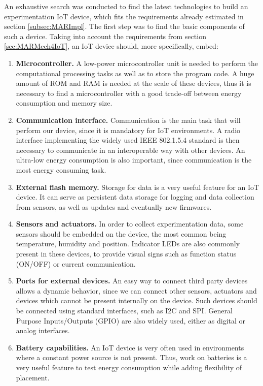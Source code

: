 An exhaustive search was conducted to find the latest technologies to build an experimentation IoT device, which fits the requirements already estimated in section \ref{subsec:MARImpl}.
The first step was to find the basic components of such a device.
Taking into account the requirements from section \ref{sec:MARMech4IoT}, an IoT device should, more specifically, embed:
\begin{enumerate}
	\item \textbf{Microcontroller.} A low-power microcontroller unit is needed to perform the computational processing tasks as well as to store the program code. 
	A huge amount of ROM and RAM is needed at the scale of these devices, thus it is necessary to find a microcontroller with a good trade-off between energy consumption and memory size.
	\item \textbf{Communication interface.} Communication is the main task that will perform our device, since it is mandatory for IoT environments.
	A radio interface implementing the widely used IEEE 802.1.5.4 standard\cite{ieee802.15.4} is then necessary to communicate in an interoperable way with other devices.
	An ultra-low energy consumption is also important, since communication is the most energy consuming task.
	\item \textbf{External flash memory.} Storage for data is a very useful feature for an IoT device. It can serve as persistent data storage for logging and data collection from sensors, as well as updates and eventually new firmwares.
	\item \textbf{Sensors and actuators.} In order to collect experimentation data, some sensors should be embedded on the device, the most common being temperature, humidity and position.
	Indicator LEDs are also commonly present in these devices, to provide visual signs such as function status (ON/OFF) or current communication.
	\item \textbf{Ports for external devices.} An easy way to connect third party devices allows a dynamic behavior, since we can connect other sensors, actuators and devices which cannot be present internally on the device.
	Such devices should be connected using standard interfaces, such as I2C and SPI.
	General Purpose Inputs/Outputs (GPIO) are also widely used, either as digital or analog interfaces.
	\item \textbf{Battery capabilities.} An IoT device is very often used in environments where a constant power source is not present.
	Thus, work on batteries is a very useful feature to test energy consumption while adding flexibility of placement.
\end{enumerate}

